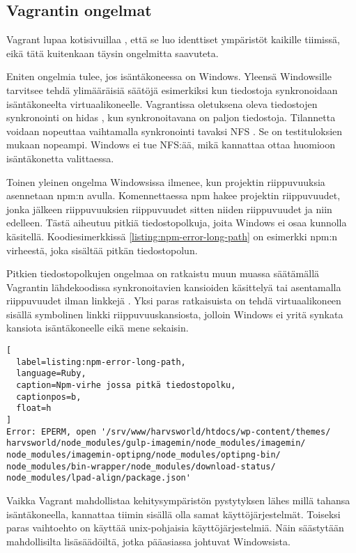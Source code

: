 \subsection{Vagrantin ongelmat}

Vagrant lupaa kotisivuillaa \cite{link:vagrant}, että se luo identtiset ympäristöt kaikille tiimissä, eikä tätä kuitenkaan täysin ongelmitta saavuteta.

Eniten ongelmia tulee, jos isäntäkoneessa on Windows. Yleensä Windowsille tarvitsee tehdä ylimääräisiä säätöjä esimerkiksi kun tiedostoja synkronoidaan isäntäkoneelta virtuaalikoneelle. Vagrantissa oletuksena oleva tiedostojen synkronointi on hidas \cite{link:vagrant-shared-folders}, kun synkronoitavana on paljon tiedostoja. Tilannetta voidaan nopeuttaa vaihtamalla synkronointi tavaksi NFS \cite{link:nfs-wiki}. Se on testituloksien mukaan nopeampi. Windows ei tue NFS:ää, mikä kannattaa ottaa huomioon isäntäkonetta valittaessa.

Toinen yleinen ongelma Windowsissa ilmenee, kun projektin riippuvuuksia asennetaan npm:n avulla. Komennettaessa  npm hakee projektin riippuvuudet, jonka jälkeen riippuvuuksien riippuvuudet sitten niiden riippuvuudet ja niin edelleen. Tästä aiheutuu pitkiä tiedostopolkuja, joita Windows ei osaa kunnolla käsitellä. Koodiesimerkkissä \ref{listing:npm-error-long-path} on esimerkki npm:n virheestä, joka sisältää pitkän tiedostopolun.

Pitkien tiedostopolkujen ongelmaa on ratkaistu muun muassa säätämällä Vagrantin lähdekoodissa synkronoitavien kansioiden käsittelyä \cite{link:fix-npm-on-vagrant-on-windows} tai asentamalla riippuvuudet ilman linkkejä \cite{link:npm-does-not-work-in-vagrant}. Yksi paras ratkaisuista on tehdä virtuaalikoneen sisällä symbolinen linkki riippuvuuskansiosta, jolloin Windows ei yritä synkata kansiota isäntäkoneelle eikä mene sekaisin.

\begin{lstlisting}[
  label=listing:npm-error-long-path,
  language=Ruby,
  caption=Npm-virhe jossa pitkä tiedostopolku,
  captionpos=b,
  float=h
]
Error: EPERM, open '/srv/www/harvsworld/htdocs/wp-content/themes/
harvsworld/node_modules/gulp-imagemin/node_modules/imagemin/
node_modules/imagemin-optipng/node_modules/optipng-bin/
node_modules/bin-wrapper/node_modules/download-status/
node_modules/lpad-align/package.json'
\end{lstlisting}

Vaikka Vagrant mahdollistaa kehitysympäristön pystytyksen lähes millä tahansa isäntäkoneella, kannattaa tiimin sisällä olla samat käyttöjärjestelmät. Toiseksi paras vaihtoehto on käyttää unix-pohjaisia käyttöjärjestelmiä. Näin säästytään mahdollisilta lisäsäädöiltä, jotka pääasiassa johtuvat Windowsista.